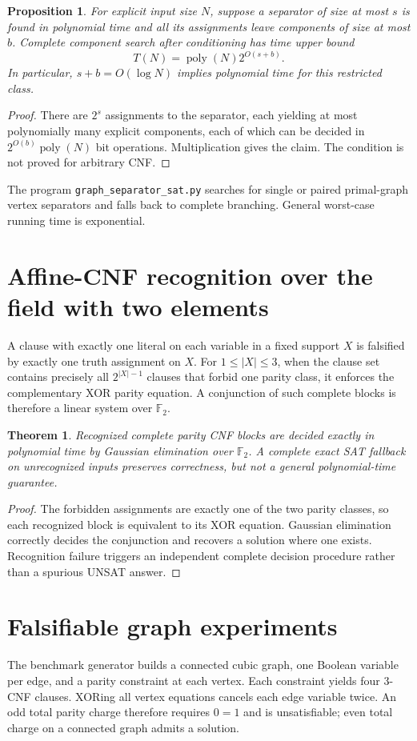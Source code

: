 \documentclass[11pt,a4paper]{article}
\newtheorem{theorem}{Theorem}
\newtheorem{proposition}{Proposition}
\begin{document}
\begin{proposition}
For explicit input size $N$, suppose a separator of size at most
$s$ is found in polynomial time and all its assignments leave
components of size at most $b$. Complete component search after
conditioning has time upper bound
\[
T(N)=\operatorname{poly}(N)2^{O(s+b)}.
\]
In particular, $s+b=O(\log N)$ implies polynomial time for
this restricted class.
\end{proposition}
\begin{proof}
There are $2^s$ assignments to the separator, each yielding at
most polynomially many explicit components, each of which can
be decided in $2^{O(b)}\operatorname{poly}(N)$ bit operations.
Multiplication gives the claim. The condition is not proved
for arbitrary CNF.
\end{proof}

The program \texttt{graph\_separator\_sat.py} searches for single
or paired primal-graph vertex separators and falls back to
complete branching. General worst-case running time is exponential.

\section{Affine-CNF recognition over the field with two elements}
A clause with exactly one literal on each variable in a fixed
support $X$ is falsified by exactly one truth assignment on $X$.
For $1\le |X|\le3$, when the clause set contains precisely all
$2^{|X|-1}$ clauses that forbid one parity class, it enforces
the complementary XOR parity equation. A conjunction of such
complete blocks is therefore a linear system over $\mathbb F_2$.

\begin{theorem}
Recognized complete parity CNF blocks are decided exactly in
polynomial time by Gaussian elimination over $\mathbb F_2$.
A complete exact SAT fallback on unrecognized inputs preserves
correctness, but not a general polynomial-time guarantee.
\end{theorem}
\begin{proof}
The forbidden assignments are exactly one of the two parity
classes, so each recognized block is equivalent to its XOR
equation. Gaussian elimination correctly decides the conjunction
and recovers a solution where one exists. Recognition failure
triggers an independent complete decision procedure rather
than a spurious UNSAT answer.
\end{proof}

\section{Falsifiable graph experiments}
The benchmark generator builds a connected cubic graph, one
Boolean variable per edge, and a parity constraint at each vertex.
Each constraint yields four 3-CNF clauses. XORing all vertex
equations cancels each edge variable twice. An odd total parity
charge therefore requires $0=1$ and is unsatisfiable; even total
charge on a connected graph admits a solution.
\end{document}
